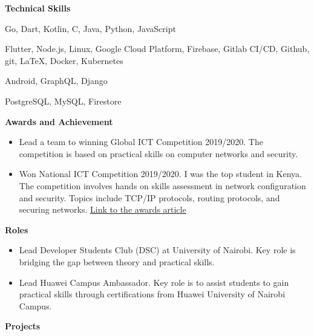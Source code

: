 \documentclass[a4paper]{article}
\begin{document}
\begin{center}
    {\Large \textbf{Technical Skills}}
\end{center}

\begin{description}[noitemsep]
    \item[Languages:] Go, Dart, Kotlin, C, Java, Python, JavaScript
    \item[Platforms and tools:] Flutter, Node.js, Linux, Google Cloud Platform, Firebase, Gitlab CI/CD, Github, git, \LaTeX, Docker, Kubernetes
    \item[Frameworks:] Android, GraphQL, Django
    \item[Databases:] PostgreSQL, MySQL, Firestore
\end{description}

\begin{center}
    {\Large \textbf{Awards and Achievement}}
\end{center}

\begin{itemize}[noitemsep]
    \item Lead a team to winning Global ICT Competition 2019/2020. The competition is based on practical skills on computer networks and security.
    \item Won National ICT Competition 2019/2020. I was the top student in Kenya. The competition involves hands on skills assessment in network configuration and security. Topics include TCP/IP protocols, routing protocols, and securing networks. \href{https://www.uonbi.ac.ke/news/uon-student-wins-huawei-network-cloud-track-award}{Link to the awards article}
\end{itemize}

\begin{center}
    {\Large \textbf{Roles}}
\end{center}

\begin{itemize}[noitemsep]
    \item Lead Developer Students Club (DSC) at University of Nairobi. Key role is bridging the gap between theory and practical skills.
    \item Lead Huawei Campus Ambassador. Key role is to assist students to gain practical skills through certifications from Huawei University of Nairobi Campus.
\end{itemize}



\begin{center}
    {\Large \textbf{Projects}}
\end{center}
\end{document}
